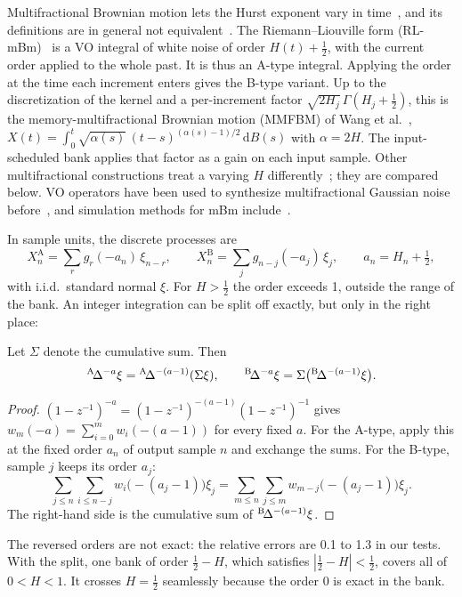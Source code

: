 Multifractional Brownian motion lets the Hurst exponent vary in time~\cite{peltier1995}, and its definitions are in general not equivalent~\cite{stoev2006}. The Riemann--Liouville form (RL-mBm)~\cite{lim2001,muniandy2001} is a VO integral of white noise of order $H(t)+\tfrac12$, with the current order applied to the whole past. It is thus an A-type integral. Applying the order at the time each increment enters gives the B-type variant. Up to the discretization of the kernel and a per-increment factor $\sqrt{2H_j}\,\Gamma(H_j+\tfrac12)$, this is the memory-multifractional Brownian motion (MMFBM) of Wang et al.~\cite{wang2023mmfbm}, $X(t)=\int_0^t\sqrt{\alpha(s)}\,(t-s)^{(\alpha(s)-1)/2}\,\mathrm dB(s)$ with $\alpha=2H$. The input-scheduled bank applies that factor as a gain on each input sample. Other multifractional constructions treat a varying $H$ differently~\cite{surgailis2008,sly2007,ryvkina2015,slezak2023}; they are compared below. VO operators have been used to synthesize multifractional Gaussian noise before~\cite{sheng2011}, and simulation methods for mBm include~\cite{chan1998}.

In sample units, the discrete processes are
\[
X^{\mathrm A}_n=\sum_r g_r(-a_n)\,\xi_{n-r},\qquad X^{\mathrm B}_n=\sum_j g_{n-j}(-a_j)\,\xi_j,\qquad a_n=H_n+\tfrac12,
\]
with i.i.d.\ standard normal $\xi$. For $H>\tfrac12$ the order exceeds 1, outside the range of the bank. An integer integration can be split off exactly, but only in the right place:

\begin{proposition}\label{prop:split}
Let $\Sigma$ denote the cumulative sum. Then
\[
{}^{\mathrm{A}}\!\Delta^{-a}\xi={}^{\mathrm{A}}\!\Delta^{-(a-1)}(\Sigma\xi),\qquad {}^{\mathrm{B}}\!\Delta^{-a}\xi=\Sigma\big({}^{\mathrm{B}}\!\Delta^{-(a-1)}\xi\big).
\]
\end{proposition}
\begin{proof}
$(1-z^{-1})^{-a}=(1-z^{-1})^{-(a-1)}(1-z^{-1})^{-1}$ gives $w_m(-a)=\sum_{i=0}^{m}w_i(-(a-1))$ for every fixed $a$. For the A-type, apply this at the fixed order $a_n$ of output sample $n$ and exchange the sums. For the B-type, sample $j$ keeps its order $a_j$:
\[
\sum_{j\le n}\sum_{i\le n-j}w_i\big(-(a_j-1)\big)\xi_j=\sum_{m\le n}\sum_{j\le m}w_{m-j}\big(-(a_j-1)\big)\xi_j .
\]
The right-hand side is the cumulative sum of ${}^{\mathrm{B}}\!\Delta^{-(a-1)}\xi$.
\end{proof}

The reversed orders are not exact: the relative errors are 0.1 to 1.3 in our tests. With the split, one bank of order $\tfrac12-H$, which satisfies $|\tfrac12-H|<\tfrac12$, covers all of $0<H<1$. It crosses $H=\tfrac12$ seamlessly because the order $0$ is exact in the bank.

